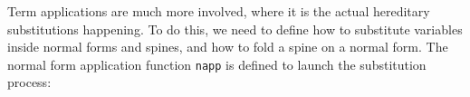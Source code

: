 Term applications are much more involved, where it is the actual hereditary substitutions happening. To do this, we need to define how to substitute variables inside normal forms and spines, and how to fold a spine on a normal form. The normal form application function \texttt{napp} is defined to launch the substitution process:

\begin{code}[hide]%
\>[0]\<%
\\
\>[0][@{}l@{\AgdaIndent{0}}]%
\>[2]\AgdaOperator{\AgdaFunction{\AgdaUnderscore{}[\AgdaUnderscore{}:=\AgdaUnderscore{}]}}\AgdaSpace{}%
\AgdaSymbol{:}\AgdaSpace{}%
\AgdaSpace{}%
\AgdaSpace{}%
\AgdaSpace{}%
\AgdaSpace{}%
\AgdaSymbol{(}\AgdaSpace{}%
\AgdaSymbol{:}\AgdaSpace{}%
\AgdaSpace{}%
\AgdaSpace{}%
\AgdaSymbol{)}\AgdaSpace{}%
\AgdaSpace{}%
\AgdaSpace{}%
\AgdaSymbol{(}\AgdaSpace{}%
\AgdaOperator{\AgdaFunction{-}}\AgdaSpace{}%
\AgdaSymbol{)}\AgdaSpace{}%
\AgdaSpace{}%
\AgdaSpace{}%
\AgdaSpace{}%
\AgdaSymbol{(}\AgdaSpace{}%
\AgdaOperator{\AgdaFunction{-}}\AgdaSpace{}%
\AgdaSymbol{)}\AgdaSpace{}%
\<%
\\
%
\>[2]\AgdaSpace{}%
\AgdaSpace{}%
\AgdaOperator{\AgdaFunction{[}}\AgdaSpace{}%
\AgdaSpace{}%
\AgdaOperator{\AgdaFunction{:=}}\AgdaSpace{}%
\AgdaSpace{}%
\AgdaOperator{\AgdaFunction{]}}\AgdaSpace{}%
\AgdaSymbol{=}\AgdaSpace{}%
\AgdaSpace{}%
\AgdaSymbol{(}\AgdaSpace{}%
\AgdaOperator{\AgdaFunction{[}}\AgdaSpace{}%
\AgdaSpace{}%
\AgdaSpace{}%
\AgdaOperator{\AgdaFunction{:=}}\AgdaSpace{}%
\AgdaSpace{}%
\AgdaSpace{}%
\AgdaSpace{}%
\AgdaOperator{\AgdaFunction{]}}\AgdaSymbol{)}\<%
\\
%
\>[2]\AgdaSpace{}%
\AgdaSymbol{(}\AgdaSpace{}%
\AgdaOperator{\AgdaInductiveConstructor{,}}\AgdaSpace{}%
\AgdaSymbol{)}\AgdaSpace{}%
\AgdaOperator{\AgdaFunction{[}}\AgdaSpace{}%
\AgdaSpace{}%
\AgdaOperator{\AgdaFunction{:=}}\AgdaSpace{}%
\AgdaSpace{}%
\AgdaOperator{\AgdaFunction{]}}\AgdaSpace{}%
\AgdaSpace{}%

\end{code}
